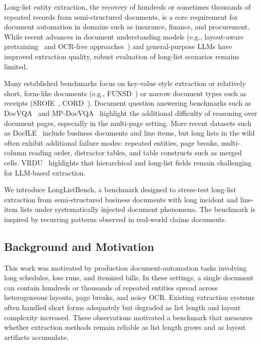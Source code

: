 Long-list entity extraction, the recovery of hundreds or sometimes thousands of repeated records from semi-structured documents, is a core requirement for document automation in domains such as insurance, finance, and procurement. While recent advances in document understanding models (e.g., layout-aware pretraining~\cite{xu2020layoutlm,huang2022layoutlmv3} and OCR-free approaches~\cite{kim2022donut}) and general-purpose LLMs have improved extraction quality, robust evaluation of long-list scenarios remains limited.

Many established benchmarks focus on key-value style extraction or relatively short, form-like documents (e.g., FUNSD~\cite{jaume2019funsd}) or narrow document types such as receipts (SROIE~\cite{huang2021sroie}, CORD~\cite{park2019cord}). Document question answering benchmarks such as DocVQA~\cite{mathew2021docvqa} and MP-DocVQA~\cite{tito2022mpdocvqa} highlight the additional difficulty of reasoning over document pages, especially in the multi-page setting. More recent datasets such as DocILE~\cite{simsa2023docile} include business documents and line items, but long lists in the wild often exhibit additional failure modes: repeated entities, page breaks, multi-column reading order, distractor tables, and table constructs such as merged cells. VRDU~\cite{wang2023vrdu} highlights that hierarchical and long-list fields remain challenging for LLM-based extraction.

We introduce LongListBench, a benchmark designed to stress-test long-list extraction from semi-structured business documents with long incident and line-item lists under systematically injected document phenomena. The benchmark is inspired by recurring patterns observed in real-world claims documents.

\subsection{Background and Motivation}
This work was motivated by production document-automation tasks involving long schedules, loss runs, and itemized bills. In these settings, a single document can contain hundreds or thousands of repeated entities spread across heterogeneous layouts, page breaks, and noisy OCR. Existing extraction systems often handled short forms adequately but degraded as list length and layout complexity increased. These observations motivated a benchmark that measures whether extraction methods remain reliable as list length grows and as layout artifacts accumulate.

